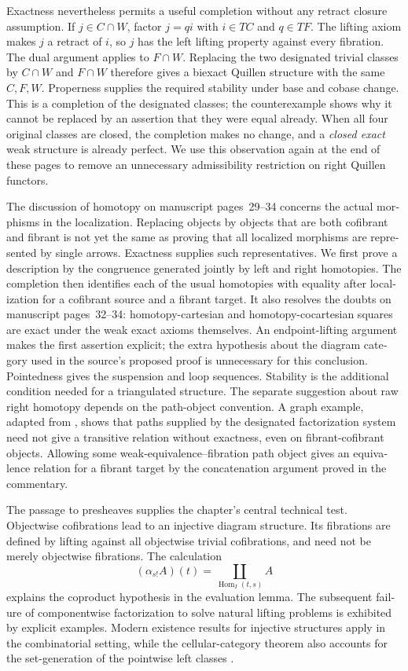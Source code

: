 \begin{otherlanguage}{english}
Exactness nevertheless permits a useful completion without any retract
closure assumption. If $j\in C\cap W$, factor $j=qi$ with $i\in TC$ and
$q\in TF$. The lifting axiom makes $j$ a retract of $i$, so $j$ has the left
lifting property against every fibration. The dual argument applies to
$F\cap W$. Replacing the two designated trivial classes by $C\cap W$ and
$F\cap W$ therefore gives a biexact Quillen structure with the same
$C,F,W$. Properness supplies the required stability under base and cobase
change. This is a completion of the designated classes; the counterexample
shows why it cannot be replaced by an assertion that they were equal
already. When all four original classes are closed, the completion makes
no change, and a \emph{closed exact} weak structure is already perfect.
We use this observation again at the end of these pages to remove an
unnecessary admissibility restriction on right Quillen functors.

The discussion of homotopy on manuscript pages~29--34 concerns the actual
morphisms in the localization. Replacing objects by objects that are both
cofibrant and fibrant is not yet the same as proving that all localized
morphisms are represented by single arrows. Exactness supplies such
representatives. We first prove a description by the congruence generated
jointly by left and right homotopies. The completion then identifies each
of the usual homotopies with equality after localization for a cofibrant
source and a fibrant target. It also resolves the doubts on manuscript
pages~32--34: homotopy-cartesian and homotopy-cocartesian squares are exact
under the weak exact axioms themselves. An endpoint-lifting argument makes
the first assertion explicit; the extra hypothesis about the diagram
category used in the source's proposed proof is unnecessary for this
conclusion. Pointedness gives the suspension and loop sequences. Stability
is the additional condition needed for a triangulated structure. The
separate suggestion about raw right homotopy depends on the path-object
convention. A graph example, adapted from \citet[Example~3.6]{KurzRosicky2005},
shows that paths supplied by the designated factorization system need not
give a transitive relation without exactness, even on fibrant-cofibrant
objects. Allowing some weak-equivalence--fibration path object gives an
equivalence relation for a fibrant target by the concatenation argument
proved in the commentary.

The passage to presheaves supplies the chapter's central technical test.
Objectwise cofibrations lead to an injective diagram structure. Its
fibrations are defined by lifting against all objectwise trivial
cofibrations, and need not be merely objectwise fibrations. The calculation
\[
 (\alpha_{s!}A)(t)=\coprod_{\operatorname{Hom}_I(t,s)} A
\]
explains the coproduct hypothesis in the evaluation lemma. The subsequent
failure of componentwise factorization to solve natural lifting problems
is exhibited by explicit examples. Modern existence results for injective
structures apply in the combinatorial setting, while the cellular-category
theorem also accounts for the set-generation of the pointwise left
classes \citep[Corollary~3.4]{MakkaiRosicky2014Cellular}.


\end{otherlanguage}
